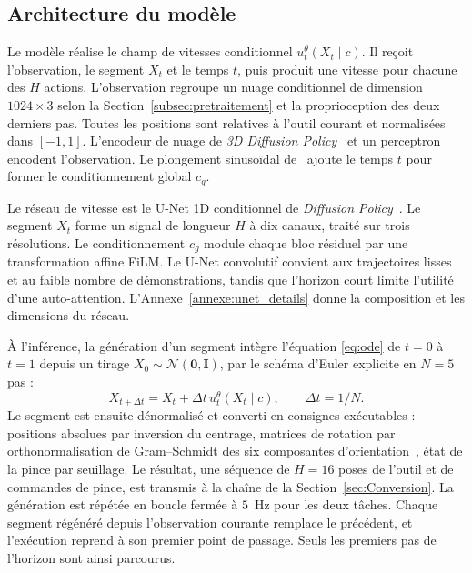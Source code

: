 \subsection{Architecture du modèle}

Le modèle réalise le champ de vitesses conditionnel $u_t^{\theta}(X_t \mid c)$. Il reçoit l'observation, le segment $X_t$ et le temps $t$, puis produit une vitesse pour chacune des $H$ actions. L'observation regroupe un nuage conditionnel de dimension $1024\times3$ selon la Section~\ref{subsec:pretraitement} et la proprioception des deux derniers pas. Toutes les positions sont relatives à l'outil courant et normalisées dans $[-1,1]$. L'encodeur de nuage de \textit{3D Diffusion Policy}~\cite{Ze2024Diffusion} et un perceptron encodent l'observation. Le plongement sinusoïdal de~\cite{Vaswani2017Attention} ajoute le temps $t$ pour former le conditionnement global $c_g$.

Le réseau de vitesse est le U-Net 1D conditionnel de \textit{Diffusion Policy}~\cite{ChiXXXXVisuomotor}. Le segment $X_t$ forme un signal de longueur $H$ à dix canaux, traité sur trois résolutions. Le conditionnement $c_g$ module chaque bloc résiduel par une transformation affine \ac{FiLM}. Le U-Net convolutif convient aux trajectoires lisses et au faible nombre de démonstrations, tandis que l'horizon court limite l'utilité d'une auto-attention. L'Annexe~\ref{annexe:unet_details} donne la composition et les dimensions du réseau.

À l'inférence, la génération d'un segment intègre l'équation \eqref{eq:ode} de $t=0$ à $t=1$ depuis un tirage $X_0\sim\mathcal{N}(\mathbf{0},\mathbf{I})$, par le schéma d'Euler explicite en $N=5$ pas :
\begin{equation}\label{eq:euler}
  X_{t+\Delta t} = X_t + \Delta t\, u_t^{\theta}(X_t \mid c), \qquad \Delta t = 1/N.
\end{equation}
Le segment est ensuite dénormalisé et converti en consignes exécutables : positions absolues par inversion du centrage, matrices de rotation par orthonormalisation de Gram--Schmidt des six composantes d'orientation~\cite{Zhou2020Continuity}, état de la pince par seuillage. Le résultat, une séquence de $H=16$ poses de l'outil et de commandes de pince, est transmis à la chaîne de la Section~\ref{sec:Conversion}. La génération est répétée en boucle fermée à $5$~Hz pour les deux tâches. Chaque segment régénéré depuis l'observation courante remplace le précédent, et l'exécution reprend à son premier point de passage. Seuls les premiers pas de l'horizon sont ainsi parcourus.

